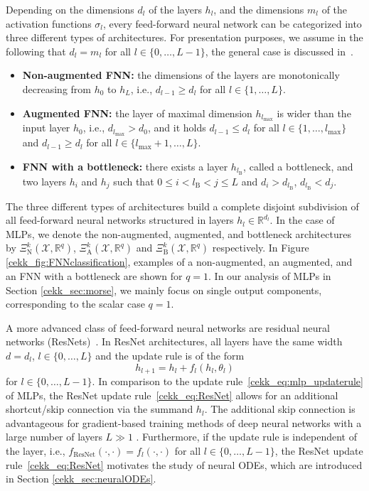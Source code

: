 \documentclass[10pt]{article}
\newcommand{\R}{{\mathbb R}}
\def\R{\mathbb{R}}
\begin{document}
Depending on the dimensions $d_l$ of the layers $h_l$, and the dimensions $m_l$ of the activation functions $\sigma_l$, every feed-forward neural network can be categorized into three different types of architectures. For presentation purposes, we assume in the following that $d_{l} = m_l$ for all $l \in \{0,\ldots,L-1\}$, the general case is discussed in~\cite{KuehnKuntz2024}.
\begin{itemize}
	\item \textbf{Non-augmented FNN:}  the dimensions of the layers are monotonically decreasing from $h_0$ to $h_L$, i.e., $d_{l-1}\geq d_{l}$ for all $l\in\{1,\ldots,L\}$.
	\item \textbf{Augmented FNN:}  the layer of maximal dimension $h_{l_\text{max}}$ is wider than the input layer $h_0$, i.e., $d_{l_\text{max}}>d_0$, and it holds $d_{l-1}\leq d_{l}$ for all $l\in\{1,\ldots,l_\text{max}\}$ and $d_{l-1}\geq d_{l}$ for all $l\in\{l_\text{max}+1,\ldots,L\}$.
	\item \textbf{FNN with a bottleneck:} there exists a layer $h_{l_\text{B}}$, called a bottleneck, and two layers $h_i$ and $h_j$ such that $0\leq i<l_\text{B}<j\leq L$ and  $d_i>d_{l_\text{B}}$, $d_{l_\text{B}}<d_j$.
\end{itemize}
The three different types of architectures build a complete disjoint subdivision of all feed-forward neural networks structured in layers $h_l\in\R^{d_l}$. In the case of MLPs, we denote the non-augmented, augmented, and bottleneck architectures by $\Xi^k_\text{N}(\mathcal{X},\mathbb{R}^q)$, $\Xi^k_\text{A}(\mathcal{X},\mathbb{R}^q)$ and $\Xi^k_\text{B}(\mathcal{X},\mathbb{R}^q)$ respectively. In Figure \ref{cekk_fig:FNNclassification}, examples of a non-augmented, an augmented, and an FNN with a bottleneck are shown for $q = 1$. In our analysis of MLPs in Section \ref{cekk_sec:morse}, we mainly focus on single output components, corresponding to the scalar case $q=1$.



A more advanced class of feed-forward neural networks are residual neural networks  (ResNets)~\cite{He2016}. In ResNet architectures, all layers have the same width $d = d_l$, $l\in\{0,\ldots,L\}$ and the update rule is of the form
\begin{equation}\label{cekk_eq:ResNet}
	h_{l+1} = h_l + f_l(h_{l},\theta_l)
\end{equation} 
for $l \in \{0,\ldots,L-1\}$. In comparison to the update rule~\eqref{cekk_eq:mlp_updaterule} of MLPs, the ResNet update rule~\eqref{cekk_eq:ResNet} allows for an additional shortcut/skip connection via the summand $h_l$. The additional skip connection is advantageous for gradient-based training methods of deep neural networks with a large number of layers $L \gg 1$ \cite{He2016}. Furthermore, if the update rule is independent of the layer, i.e., $f_\text{ResNet}(\cdot,\cdot) = f_l(\cdot,\cdot)$ for all $l \in \{0,\ldots,L-1\}$, the ResNet update rule~\eqref{cekk_eq:ResNet} motivates the study of neural ODEs, which are introduced in Section \ref{cekk_sec:neuralODEs}.
\end{document}
